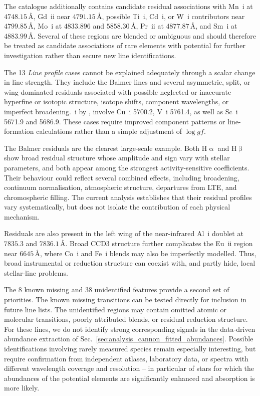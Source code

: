 \documentclass[twocolumn,apj,numberedappendix,appendixfloats]{openjournal}
\begin{document}
The catalogue additionally contains candidate residual associations with Mn~{\sc i} at $4748.15\,\text{\AA}$, Gd~{\sc ii} near $4791.15\,\text{\AA}$, possible Ti~{\sc i}, Cd~{\sc i}, or W~{\sc i} contributors near $4799.85\,\text{\AA}$, Mo~{\sc i} at $4833.896$ and $5858.30\,\text{\AA}$, Pr~{\sc ii} at $4877.87\,\text{\AA}$, and Sm~{\sc i} at $4883.99\,\text{\AA}$. Several of these regions are blended or ambiguous and should therefore be treated as candidate associations of rare elements with potential for further investigation rather than secure new line identifications.

The 13 \textit{Line profile} cases cannot be explained adequately through a scalar change in line strength. They include the Balmer lines and several asymmetric, split, or wing-dominated residuals associated with possible neglected or inaccurate hyperfine or isotopic structure, isotope shifts, component wavelengths, or imperfect broadening.~{\sc i} by \citet{Jofre2017}, involve Cu~{\sc i} 5700.2, V~{\sc i} 5761.4, as well as Sc~{\sc i} 5671.9 and 5686.9. These cases require improved component patterns or line-formation calculations rather than a simple adjustment of $\log gf$.

The Balmer residuals are the clearest large-scale example. Both $\mathrm{H}\upalpha$ and $\mathrm{H}\upbeta$ show broad residual structure whose amplitude and sign vary with stellar parameters, and both appear among the strongest activity-sensitive coefficients. Their behaviour could reflect several combined effects, including broadening, continuum normalisation, atmospheric structure, departures from LTE, and chromospheric filling. The current analysis establishes that their residual profiles vary systematically, but does not isolate the contribution of each physical mechanism.

Residuals are also present in the left wing of the near-infrared Al~{\sc i} doublet at $7835.3$ and $7836.1\,\text{\AA}$. Broad CCD3 structure further complicates the Eu~{\sc ii} region near $6645\,\text{\AA}$, where Co~{\sc i} and Fe~{\sc i} blends may also be imperfectly modelled. Thus, broad instrumental or reduction structure can coexist with, and partly hide, local stellar-line problems.

The 8 known missing and 38 unidentified features provide a second set of priorities. The known missing transitions can be tested directly for inclusion in future line lists. The unidentified regions may contain omitted atomic or molecular transitions, poorly attributed blends, or residual reduction structure. For these lines, we do not identify strong corresponding signals in the data-driven abundance extraction of Sec.~\ref{sec:analysis_cannon_fitted_abundances}. Possible identifications involving rarely measured species remain especially interesting, but require confirmation from independent atlases, laboratory data, or spectra with different wavelength coverage and resolution -- in particular of stars for which the abundances of the potential elements are significantly enhanced and absorption is more likely.
\end{document}

